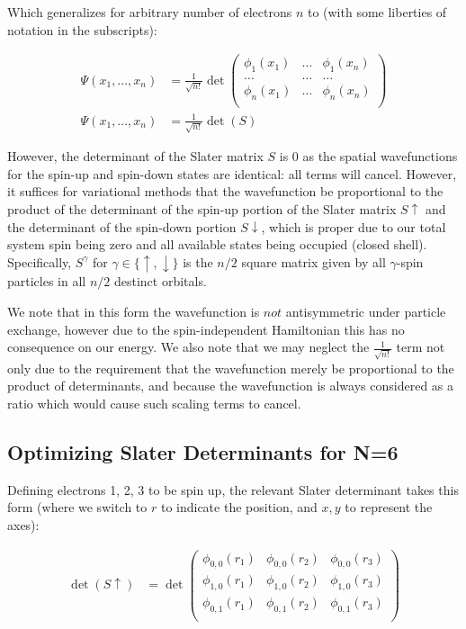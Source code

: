 \documentclass[11pt, conference, compsocconf]{IEEEtran}
\begin{document}
Which generalizes for arbitrary number of electrons $n$ to (with some liberties of notation in the subscripts):

\begin{align}\Psi\left(x_1,\dots,x_n\right) &=\frac{1}{\sqrt{n!}}\det\left(\begin{array}{ccc}
\phi_1\left(x_1\right) & \dots & \phi_1\left(x_n\right)\\
\dots & \dots & \dots\\
\phi_n\left(x_1\right) & \dots & \phi_n\left(x_n\right)\\
\end{array}\right)\\
\Psi\left(x_1,\dots,x_n\right) &=\frac{1}{\sqrt{n!}}\det(S)\end{align}

However, the determinant of the Slater matrix $S$ is 0 as the spatial wavefunctions for the spin-up and spin-down states are identical: all terms will cancel. However, it suffices for variational methods that the wavefunction be proportional to the product of the determinant of the spin-up portion of the Slater matrix $S\uparrow$ and the determinant of the spin-down portion $S\downarrow$, which is proper due to our total system spin being zero and all available states being occupied (closed shell). Specifically, $S^\gamma$ for $\gamma \in \{\uparrow, \downarrow\}$ is the $n/2$ square matrix given by all $\gamma$-spin particles in all $n/2$ destinct orbitals.

We note that in this form the wavefunction is $not$ antisymmetric under particle exchange, however due to the spin-independent Hamiltonian this has no consequence on our energy. We also note that we may neglect the $\frac{1}{\sqrt{n!}}$ term not only due to the requirement that the wavefunction merely be proportional to the product of determinants, and because the wavefunction is always considered as a ratio which would cause such scaling terms to cancel.

\subsection{Optimizing Slater Determinants for N=6}
Defining electrons 1, 2, 3 to be spin up, the relevant Slater determinant takes this form (where we switch to $r$ to indicate the position, and $x,y$ to represent the axes):

\begin{align}\det\left(S\uparrow\right) &=\det\left(\begin{array}{ccc}
\phi_{0,0}\left(r_1\right) & \phi_{0,0}\left(r_2\right) & \phi_{0,0}\left(r_3\right)\\
\phi_{1,0}\left(r_1\right) & \phi_{1,0}\left(r_2\right) & \phi_{1,0}\left(r_3\right)\\
\phi_{0,1}\left(r_1\right) & \phi_{0,1}\left(r_2\right) & \phi_{0,1}\left(r_3\right)\\
\end{array}\right)\end{align}
\end{document}
